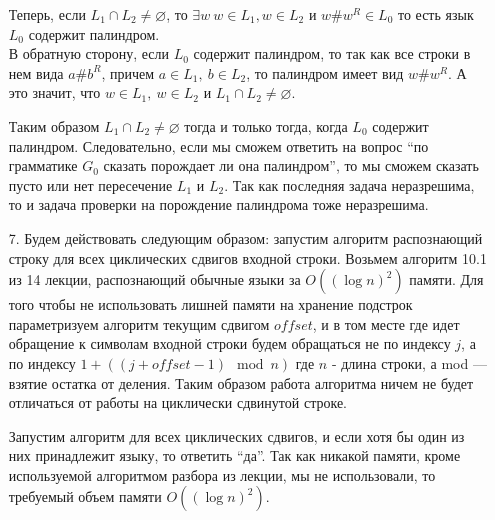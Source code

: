 \documentclass[12pt]{article}
\begin{document}
\begin{enumerate}
	Теперь, если $L_1 \cap L_2 \neq \varnothing$, то $\exists w\ w \in L_1, w \in L_2$ и $w\#w^R \in L_0$ то есть язык $L_0$ содержит палиндром. \\
	В обратную сторону, если $L_0$ содержит палиндром, то так как все строки в нем вида $a\#b^R$, причем $a \in L_1,\ b \in L_2$, то палиндром имеет вид $w\#w^R$. А это значит, что $w \in L_1,\ w \in L_2$ и $L_1 \cap L_2 \neq \varnothing$.
	
	Таким образом $L_1 \cap L_2 \neq \varnothing$ тогда и только тогда, когда $L_0$ содержит палиндром. Следовательно, если мы сможем ответить на вопрос ``по грамматике $G_0$ сказать порождает ли она палиндром'', то мы сможем сказать пусто или нет пересечение $L_1$ и $L_2$. Так как последняя задача неразрешима, то и задача проверки на порождение палиндрома тоже неразрешима.

	\item[7.] Будем действовать следующим образом: запустим алгоритм распознающий строку для всех циклических сдвигов входной строки. Возьмем алгоритм 10.1 из 14 лекции, распознающий обычные языки за $O((\log n)^2)$ памяти. Для того чтобы не использовать лишней памяти на хранение подстрок параметризуем алгоритм текущим сдвигом $\mathit{offset}$, и в том месте где идет обращение к символам входной строки будем обращаться не по индексу $j$, а по индексу $1 + ((j + \mathit{offset}-1) \!\! \mod n)$ где $n$ - длина строки, а mod --- взятие остатка от деления. Таким образом работа алгоритма ничем не будет отличаться от работы на циклически сдвинутой строке.
	
	Запустим алгоритм для всех циклических сдвигов, и если хотя бы один из них принадлежит языку, то ответить ``да''. Так как никакой памяти, кроме используемой алгоритмом разбора из лекции, мы не использовали, то требуемый объем памяти $O((\log n)^2)$.
\end{enumerate}
\end{document}
